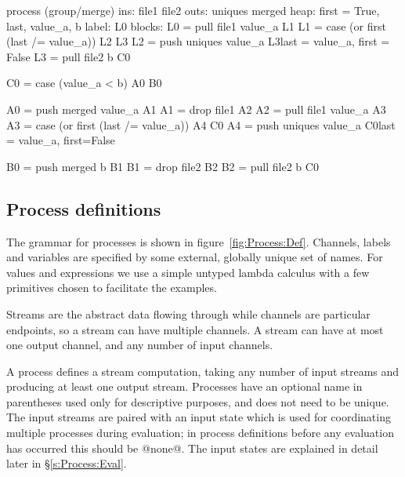 \begin{code}
process (group/merge)
     ins: file1 file2
    outs: uniques merged
    heap: {first = True, last, value_a, b}
   label: L0
  blocks: L0 = pull file1   value_a               L1
          L1 = case (or first (last /= value_a))  L2    L3
          L2 = push uniques value_a               L3{last = value_a, first = False}
          L3 = pull file2 b                       C0

          C0 = case (value_a < b)                 A0    B0

          A0 = push merged  value_a               A1
          A1 = drop file1                         A2
          A2 = pull file1   value_a               A3
          A3 = case (or first (last /= value_a))  A4    C0
          A4 = push uniques value_a               C0{last = value_a, first=False}

          B0 = push merged b                      B1
          B1 = drop file2                         B2
          B2 = pull file2  b                      C0
\end{code}


\clearpage{}
\subsection{Process definitions}



The grammar for processes is shown in figure~\ref{fig:Process:Def}.
Channels, labels and variables are specified by some external, globally unique set of names.
For values and expressions we use a simple untyped lambda calculus with a few primitives chosen to facilitate the examples.

Streams are the abstract data flowing through while channels are particular endpoints, so a stream can have multiple channels.
A stream can have at most one output channel, and any number of input channels.

A process defines a stream computation, taking any number of input streams and producing at least one output stream.
Processes have an optional name in parentheses used only for descriptive purposes, and does not need to be unique.
The input streams are paired with an input state which is used for coordinating multiple processes during evaluation; in process definitions before any evaluation has occurred this should be @none@.
The input states are explained in detail later in \S\ref{s:Process:Eval}.

